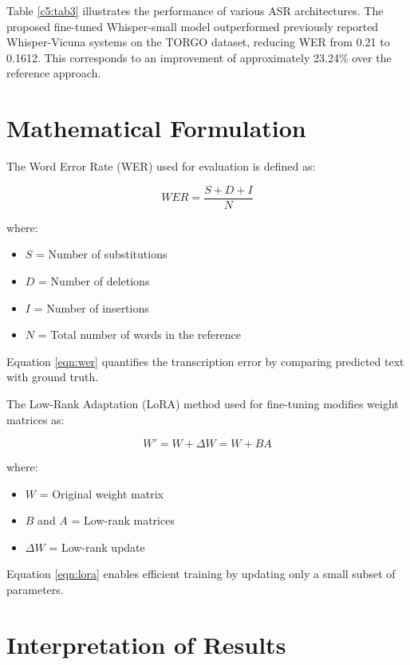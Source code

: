 Table \ref{c5:tab3} illustrates the performance of various ASR architectures. The proposed fine-tuned Whisper-small model outperformed previously reported Whisper-Vicuna systems on the TORGO dataset, reducing WER from 0.21 to 0.1612. This corresponds to an improvement of approximately 23.24\% over the reference approach.

\section{Mathematical Formulation}

The Word Error Rate (WER) used for evaluation is defined as:

\begin{equation}
\label{eqn:wer}
WER = \frac{S + D + I}{N}
\end{equation}

where:
\begin{itemize}
\item $S$ = Number of substitutions
\item $D$ = Number of deletions
\item $I$ = Number of insertions
\item $N$ = Total number of words in the reference
\end{itemize}

Equation \ref{eqn:wer} quantifies the transcription error by comparing predicted text with ground truth.

The Low-Rank Adaptation (LoRA) method used for fine-tuning modifies weight matrices as:

\begin{equation}
\label{eqn:lora}
W' = W + \Delta W = W + BA
\end{equation}

where:
\begin{itemize}
\item $W$ = Original weight matrix
\item $B$ and $A$ = Low-rank matrices
\item $\Delta W$ = Low-rank update
\end{itemize}

Equation \ref{eqn:lora} enables efficient training by updating only a small subset of parameters.

\section{Interpretation of Results}

